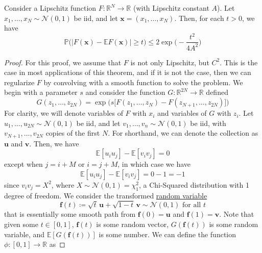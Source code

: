   \begin{theorem}
    \label{thm:talagrands-gaussian-inequality}
  Consider a Lipschitz function $F: \mathbb{R}^N \to \mathbb{R}$ (with Lipschitz constant $A$). Let $x_1, \ldots, x_N \sim \mathcal{N}(0, 1)$ be iid, and let $\mathbf{x} = (x_1, \ldots, x_N)$. Then, for each $t > 0$, we have 
  \begin{equation}
    \mathbb{P} \big( | F(\mathbf{x}) - \mathbb{E} F(\mathbf{x}) | \geq t \big) \leq 2 \exp \bigg(- \frac{t^2}{4A^2} \bigg)
  \end{equation}
  \end{theorem}
  \begin{proof}
  For this proof, we assume that $F$ is not only Lipschitz, but $C^2$. This is the case in most applications of this theorem, and if it is not the case, then we can regularize $F$ by convolving with a smooth function to solve the problem. We begin with a parameter $s$ and consider the function $G: \mathbb{R}^{2N} \to \mathbb{R}$ defined 
  \begin{equation}
    G(z_1, \ldots, z_{2N}) = \exp \Big( s \big[ F ( z_1, \ldots, z_N) - F(z_{N+1}, \ldots, z_{2N}) \big] \Big)
  \end{equation}
  For clarity, we will denote variables of $F$ with $x_i$ and variables of $G$ with $z_i$. Let $u_1, \ldots, u_{2N} \sim \mathcal{N}(0, 1)$ be iid, and let $v_1, \ldots, v_n \sim \mathcal{N}(0, 1)$ be iid, with $v_{N+1}, \ldots, v_{2N}$ copies of the first $N$. For shorthand, we can denote the collection as $\mathbf{u}$ and $\mathbf{v}$. Then, we have 
  \begin{equation}
    \mathbb{E} [u_i u_j] - \mathbb{E}[ v_i v_j] = 0
  \end{equation}
  except when $j = i + M$ or $i = j + M$, in which case we have 
  \begin{equation}
    \mathbb{E} [u_i u_j] - \mathbb{E}[ v_i v_j] = 0 - 1 = -1
  \end{equation}
  since $v_i v_j = X^2$, where $X \sim \mathcal{N}(0, 1) = \chi^2_1$, a Chi-Squared distribution with 1 degree of freedom. We consider the transformed \hyperref[prob-def:random-variable]{random variable}
  \begin{equation}
    \mathbf{f}(t) \coloneqq \sqrt{t} \, \mathbf{u} + \sqrt{1 - t} \, \mathbf{v} \sim \mathcal{N}(0, 1) \text{ for all } t
  \end{equation}
  that is essentially some smooth path from $\mathbf{f}(0) = \mathbf{u}$ and $\mathbf{f}(1) = \mathbf{v}$. Note that given some $t \in [0, 1]$, $\mathbf{f}(t)$ is some random vector, $G ( \mathbf{f}(t))$ is some random variable, and $\mathbb{E}[ G(\mathbf{f}(t))]$ is some number. We can define the function $\phi: [0, 1] \to \mathbb{R}$ as 

\end{proof}
